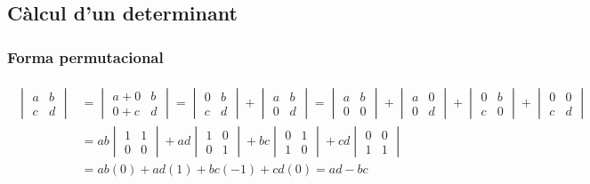 \subsection{Càlcul d'un determinant}
\subsubsection*{Forma permutacional}
\begin{align}
    \begin{aligned}
        \begin{vmatrix} a & b\\ c & d\end{vmatrix} &= \begin{vmatrix} a+0 & b \\ 0+c & d \end{vmatrix} = \begin{vmatrix} 0 & b \\ c & d \end{vmatrix} + \begin{vmatrix} a & b \\ 0 & d \end{vmatrix} = \begin{vmatrix} a & b \\ 0 & 0 \end{vmatrix} + \begin{vmatrix} a & 0 \\ 0 & d \end{vmatrix} + \begin{vmatrix} 0 & b \\ c & 0 \end{vmatrix} + \begin{vmatrix} 0 & 0 \\ c & d \end{vmatrix} \\
    &= ab \begin{vmatrix} 1 & 1 \\ 0 & 0 \end{vmatrix} + ad \begin{vmatrix} 1 & 0 \\ 0 & 1 \end{vmatrix} + bc \begin{vmatrix} 0 & 1 \\ 1 & 0 \end{vmatrix} + cd \begin{vmatrix} 0 & 0 \\ 1 & 1 \end{vmatrix} \\
    &= ab (0) + ad (1) +bc (-1) + cd (0) = ad - bc
    \end{aligned}
\end{align}

